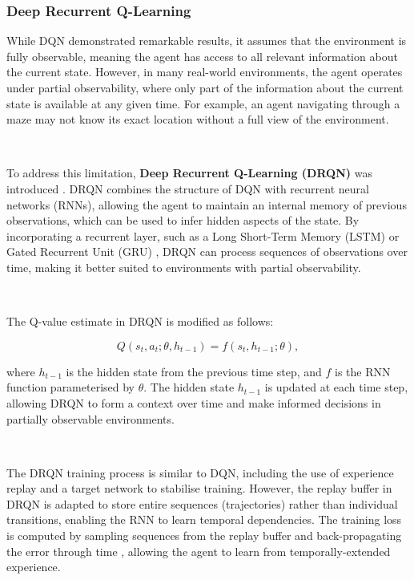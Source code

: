 \documentclass{article}
\begin{document}
\subsubsection{Deep Recurrent Q-Learning}\label{sec:drqn}

While DQN demonstrated remarkable results, it assumes that the environment is fully observable, meaning the agent has access to all relevant information about the current state. However, in many real-world environments, the agent operates under partial observability, where only part of the information about the current state is available at any given time. For example, an agent navigating through a maze may not know its exact location without a full view of the environment.

\

To address this limitation, \textbf{Deep Recurrent Q-Learning (DRQN)} was introduced \citep{hausknecht2015deep}. DRQN combines the structure of DQN with recurrent neural networks (RNNs), allowing the agent to maintain an internal memory of previous observations, which can be used to infer hidden aspects of the state. By incorporating a recurrent layer, such as a Long Short-Term Memory (LSTM) \citep{hochreiter1997long} or Gated Recurrent Unit (GRU) \citep{chung2014empirical}, DRQN can process sequences of observations over time, making it better suited to environments with partial observability.

\

The Q-value estimate in DRQN is modified as follows:

\begin{equation}
Q(s_t, a_t; \theta, h_{t-1}) = f(s_t, h_{t-1}; \theta),
\end{equation}

where $h_{t-1}$ is the hidden state from the previous time step, and $f$ is the RNN function parameterised by $\theta$. The hidden state $h_{t-1}$ is updated at each time step, allowing DRQN to form a context over time and make informed decisions in partially observable environments.

\

The DRQN training process is similar to DQN, including the use of experience replay and a target network to stabilise training. However, the replay buffer in DRQN is adapted to store entire sequences (trajectories) rather than individual transitions, enabling the RNN to learn temporal dependencies. The training loss is computed by sampling sequences from the replay buffer and back-propagating the error through time \citep{werbos1990backpropagation}, allowing the agent to learn from temporally-extended experience.
\end{document}
